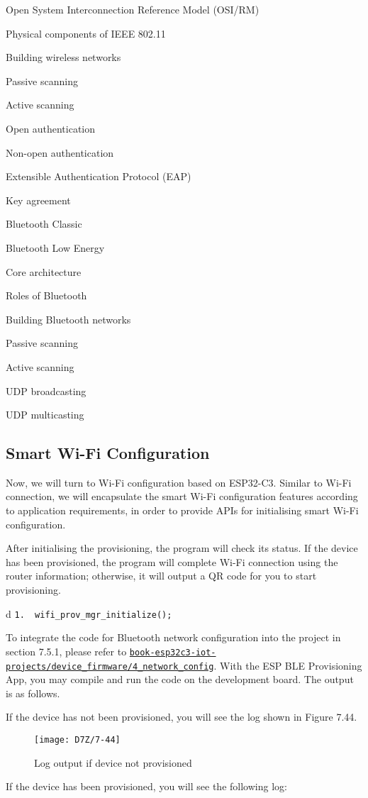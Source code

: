 \documentclass[a4paper,12pt]{book}
\begin{document}
\begin{term}{Open System Interconnection Reference Model (OSI/RM)}
\begin{term}{Physical components of IEEE 802.11}
\begin{term}{Building wireless networks}
\begin{term}{Passive scanning}
\begin{term}{Active scanning}
\begin{term}{Open authentication}
\begin{term}{Non-open authentication}
\begin{term}{Extensible Authentication Protocol (EAP)}
\begin{term}{Key agreement}
\begin{term}{Bluetooth Classic}
\begin{term}{Bluetooth Low Energy}
\begin{term}{Core architecture}
\begin{term}{Roles of Bluetooth}
\begin{term}{Building Bluetooth networks}
\begin{term}{Passive scanning}
\begin{term}{Active scanning}
\begin{term}{UDP broadcasting}
\begin{term}{UDP multicasting}
\subsection{Smart Wi-Fi Configuration}
Now, we will turn to Wi-Fi configuration based on ESP32-C3. Similar to Wi-Fi connection, we will encapsulate the smart Wi-Fi configuration features according to application requirements, in order to provide APIs for initialising smart Wi-Fi configuration.

After initialising the provisioning, the program will check its status. If the device has been provisioned, the program will complete Wi-Fi connection using the router information; otherwise, it will output a QR code for you to start provisioning.


\begin{tabular}{d}
\verb|1.  wifi_prov_mgr_initialize();|
\end{tabular}


To integrate the code for Bluetooth network configuration into the project in section 7.5.1, please refer to \href{https://github.com/espressif/book-esp32c3-iot-projects/tree/main/device_firmware/4_network_config}{\texttt{book-esp32c3-iot-projects/device\_firmware/4\_network\_config}}. With the ESP BLE Provisioning App, you may compile and run the code on the development board. The output is as follows.


If the device has not been provisioned, you will see the log shown in Figure 7.44.

\begin{figure}[!h]
    \centering
    \texttt{[image: D7Z/7-44]}
    \caption{Log output if device not provisioned}
\end{figure}

If the device has been provisioned, you will see the following log:



\end{term}
\end{term}
\end{term}
\end{term}
\end{term}
\end{term}
\end{term}
\end{term}
\end{term}
\end{term}
\end{term}
\end{term}
\end{term}
\end{term}
\end{term}
\end{term}
\end{term}
\end{term}
\end{document}
